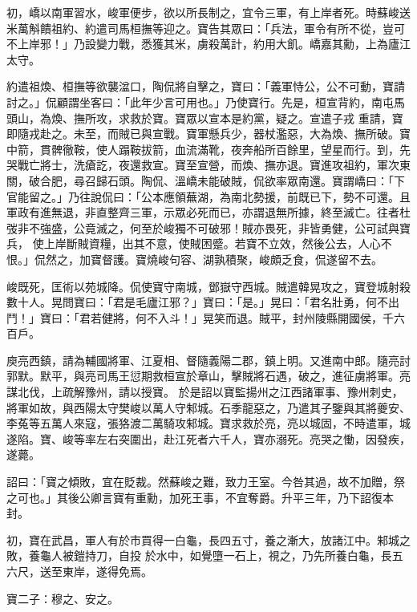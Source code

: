 \begin{pinyinscope}
 初，嶠以南軍習水，峻軍便步，欲以所長制之，宜令三軍，有上岸者死。時蘇峻送米萬斛饋祖約、約遣司馬桓撫等迎之。寶告其眾曰：「兵法，軍令有所不從，豈可不上岸邪！」乃設變力戰，悉獲其米，虜殺萬計，約用大飢。嶠嘉其勳，上為廬江太守。



 約遣祖煥、桓撫等欲襲湓口，陶侃將自擊之，寶曰：「義軍恃公，公不可動，寶請討之。」侃顧謂坐客曰：「此年少言可用也。」乃使寶行。先是，桓宣背約，南屯馬頭山，為煥、撫所攻，求救於寶。寶眾以宣本是約黨，疑之。宣遣子戎
 重請，寶即隨戎赴之。未至，而賊已與宣戰。寶軍懸兵少，器杖濫惡，大為煥、撫所破。寶中箭，貫髀徹鞍，使人蹋鞍拔箭，血流滿靴，夜奔船所百餘里，望星而行。到，先哭戰亡將士，洗瘡訖，夜還救宣。寶至宣營，而煥、撫亦退。寶進攻祖約，軍次東關，破合肥，尋召歸石頭。陶侃、溫嶠未能破賊，侃欲率眾南還。寶謂嶠曰：「下官能留之。」乃往說侃曰：「公本應領蕪湖，為南北勢援，前既已下，勢不可還。且軍政有進無退，非直整齊三軍，示眾必死而已，亦謂退無所據，終至滅亡。往者杜弢非不強盛，公竟滅之，何至於峻獨不可破邪！賊亦畏死，非皆勇健，公可試與寶兵，
 使上岸斷賊資糧，出其不意，使賊困蹙。若寶不立效，然後公去，人心不恨。」侃然之，加寶督護。寶燒峻句容、湖孰積聚，峻頗乏食，侃遂留不去。



 峻既死，匡術以苑城降。侃使寶守南城，鄧嶽守西城。賊遣韓晃攻之，寶登城射殺數十人。晃問寶曰：「君是毛廬江邪？」寶曰：「是。」晃曰：「君名壯勇，何不出鬥！」寶曰：「君若健將，何不入斗！」晃笑而退。賊平，封州陵縣開國侯，千六百戶。



 庾亮西鎮，請為輔國將軍、江夏相、督隨義陽二郡，鎮上明。又進南中郎。隨亮討郭默。默平，與亮司馬王愆期救桓宣於章山，擊賊將石遇，破之，進征虜將軍。亮謀北伐，上疏解豫州，請以授寶。
 於是詔以寶監揚州之江西諸軍事、豫州刺史，將軍如故，與西陽太守樊峻以萬人守邾城。石季龍惡之，乃遣其子鑒與其將夔安、李菟等五萬人來寇，張狢渡二萬騎攻邾城。寶求救於亮，亮以城固，不時遣軍，城遂陷。寶、峻等率左右突圍出，赴江死者六千人，寶亦溺死。亮哭之慟，因發疾，遂薨。



 詔曰：「寶之傾敗，宜在貶裁。然蘇峻之難，致力王室。今咎其過，故不加贈，祭之可也。」其後公卿言寶有重勳，加死王事，不宜奪爵。升平三年，乃下詔復本封。



 初，寶在武昌，軍人有於市買得一白龜，長四五寸，養之漸大，放諸江中。邾城之敗，養龜人被鎧持刀，自投
 於水中，如覺墮一石上，視之，乃先所養白龜，長五六尺，送至東岸，遂得免焉。



 寶二子：穆之、安之。




\end{pinyinscope}
